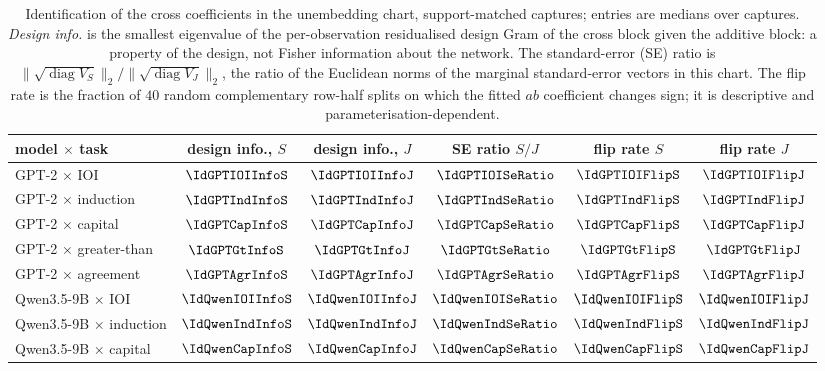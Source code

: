 \begin{table}[!htbp]
\centering\small
\begin{tabular}{lccccc}
\toprule
model $\times$ task & design info., $S$ & design info., $J$ & SE ratio $S/J$ & flip rate $S$ & flip rate $J$ \\
\midrule
GPT-2 $\times$ IOI          & $\IdGPTIOIInfoS$  & $\IdGPTIOIInfoJ$  & $\IdGPTIOISeRatio$  & $\IdGPTIOIFlipS$  & $\IdGPTIOIFlipJ$ \\
GPT-2 $\times$ induction    & $\IdGPTIndInfoS$  & $\IdGPTIndInfoJ$  & $\IdGPTIndSeRatio$  & $\IdGPTIndFlipS$  & $\IdGPTIndFlipJ$ \\
GPT-2 $\times$ capital      & $\IdGPTCapInfoS$  & $\IdGPTCapInfoJ$  & $\IdGPTCapSeRatio$  & $\IdGPTCapFlipS$  & $\IdGPTCapFlipJ$ \\
GPT-2 $\times$ greater-than & $\IdGPTGtInfoS$   & $\IdGPTGtInfoJ$   & $\IdGPTGtSeRatio$   & $\IdGPTGtFlipS$   & $\IdGPTGtFlipJ$ \\
GPT-2 $\times$ agreement    & $\IdGPTAgrInfoS$  & $\IdGPTAgrInfoJ$  & $\IdGPTAgrSeRatio$  & $\IdGPTAgrFlipS$  & $\IdGPTAgrFlipJ$ \\
Qwen3.5-9B $\times$ IOI     & $\IdQwenIOIInfoS$ & $\IdQwenIOIInfoJ$ & $\IdQwenIOISeRatio$ & $\IdQwenIOIFlipS$ & $\IdQwenIOIFlipJ$ \\
Qwen3.5-9B $\times$ induction & $\IdQwenIndInfoS$ & $\IdQwenIndInfoJ$ & $\IdQwenIndSeRatio$ & $\IdQwenIndFlipS$ & $\IdQwenIndFlipJ$ \\
Qwen3.5-9B $\times$ capital & $\IdQwenCapInfoS$ & $\IdQwenCapInfoJ$ & $\IdQwenCapSeRatio$ & $\IdQwenCapFlipS$ & $\IdQwenCapFlipJ$ \\
\bottomrule
\end{tabular}
\caption{Identification of the cross coefficients in the unembedding chart, support-matched captures; entries are
medians over captures. \emph{Design info.} is the smallest eigenvalue of the per-observation residualised design Gram
of the cross block given the additive block: a property of the design, not Fisher information about the network.
The standard-error (SE) ratio is $\|\sqrt{\operatorname{diag}V_S}\|_2/\|\sqrt{\operatorname{diag}V_J}\|_2$,
the ratio of the Euclidean norms of the marginal standard-error vectors in this chart. The flip rate
is the fraction of $40$ random complementary row-half splits on which the fitted $ab$ coefficient changes sign; it is
descriptive and parameterisation-dependent.}
\label{tab:ident}
\end{table}

\clearpage
